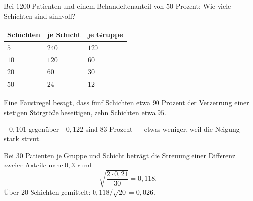 \begin{aufgabe}
Bei $1200$ Patienten und einem Behandeltenanteil von $50$ Prozent: Wie viele Schichten sind sinnvoll?

\loesung
{}
\begin{center}
{\small
\renewcommand{\arraystretch}{1.46}
\begin{tabular}{@{}P{2.0cm}P{2.2cm}P{2.6cm}@{}}
\toprule
\textbf{Schichten} & \textbf{je Schicht} & \textbf{je Gruppe}\\
\midrule
$5$ & $240$ & $120$\\
$10$ & $120$ & $60$\\
$20$ & $60$ & $30$\\
$50$ & $24$ & $12$\\
\bottomrule
\end{tabular}}
\end{center}

Eine Faustregel besagt, dass fünf Schichten etwa $90$ Prozent der Verzerrung einer stetigen Störgröße beseitigen, zehn Schichten etwa $95$.

 $-0{,}101$ gegenüber $-0{,}122$ sind $83$ Prozent --- etwas weniger, weil die Neigung stark streut.

Bei $30$ Patienten je Gruppe und Schicht beträgt die Streuung einer Differenz zweier Anteile nahe $0{,}3$ rund
\[ \sqrt{\frac{2\cdot0{,}21}{30}} = 0{,}118 . \]
Über $20$ Schichten gemittelt: $0{,}118/\sqrt{20} = 0{,}026$.

\begin{center}
\begin{minipage}{0.88\textwidth}
\end{minipage}
\end{center}
\end{aufgabe}

